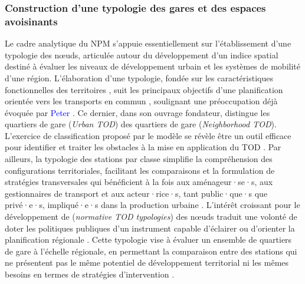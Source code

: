 \begin{refsegment}
\subsubsection*{Construction d'une typologie des gares et des espaces avoisinants
    \label{chap6:litterature-concept-typologie}
    }

Le cadre analytique du \acrshort{NPM} s'appuie essentiellement sur l'établissement d'une typologie des nœuds, articulée autour du développement d'un indice spatial destiné à évaluer les niveaux de développement urbain et les systèmes de mobilité d'une région. L'élaboration d'une typologie, fondée sur les caractéristiques fonctionnelles des territoires \textcolor{blue}{\autocite[2]{amini_pishro_node_2022}}, suit les principaux objectifs d'une planification orientée vers les transports en commun \textcolor{blue}{\autocite[1]{motieyan_development_2018}}, soulignant une préoccupation déjà évoquée par \textcolor{blue}{Peter} \textcolor{blue}{\textcite[57]{calthorpe_next_1993}}. Ce dernier, dans son ouvrage fondateur, distingue les quartiers de gare  (\textsl{Urban TOD}) des quartiers de gare  (\textsl{Neighborhood TOD}). L'exercice de classification proposé par le modèle se révèle être un outil efficace pour identifier et traiter les obstacles à la mise en application du \acrshort{TOD} \textcolor{blue}{\autocite[55]{kamruzzaman_advance_2014}}. Par ailleurs, la typologie des stations par classe simplifie la compréhension des configurations territoriales, facilitant les comparaisons et la formulation de stratégies transversales qui bénéficient à la fois aux aménageur·se·s, aux gestionnaires de transport et aux acteur·rice·s, tant public·que·s que privé·e·s, impliqué·e·s dans la production urbaine \textcolor{blue}{\autocite[55]{kamruzzaman_advance_2014}}. L'intérêt croissant pour le développement de  (\textsl{normative TOD typologies}) des nœuds traduit une volonté de doter les politiques publiques d'un instrument capable d'éclairer ou d'orienter la planification régionale \textcolor{blue}{\autocite[307]{higgins_forty_2016}}. Cette typologie vise à évaluer un ensemble de quartiers de gare à l'échelle régionale, en permettant la comparaison entre des stations qui ne présentent pas le même potentiel de développement territorial ni les mêmes besoins en termes de stratégies d'intervention \textcolor{blue}{\autocite[2]{iau_articulation_2017}}.%


\end{refsegment}
